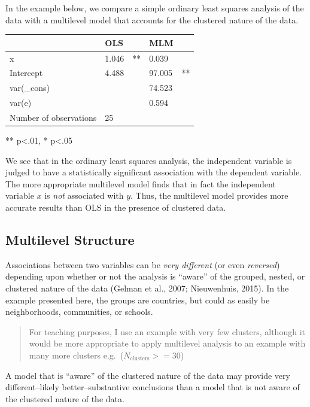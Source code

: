 \documentclass[
  letterpaper,
  DIV=11,
  numbers=noendperiod]{scrreprt}
\begin{document}
In the example below, we compare a simple ordinary least squares
analysis of the data with a multilevel model that accounts for the
clustered nature of the data.

\begin{longtable}[]{@{}lllll@{}}
\toprule\noalign{}
& OLS & & MLM & \\
\midrule\noalign{}
\endhead
\bottomrule\noalign{}
\endlastfoot
x & 1.046 & ** & 0.039 & \\
Intercept & 4.488 & & 97.005 & ** \\
var(\_cons) & & & 74.523 & \\
var(e) & & & 0.594 & \\
Number of observations & 25 & & & \\
\end{longtable}

** p\textless.01, * p\textless.05

We see that in the ordinary least squares analysis, the independent
variable is judged to have a statistically significant association with
the dependent variable. The more appropriate multilevel model finds that
in fact the independent variable \(x\) is \emph{not} associated with
\(y\). Thus, the multilevel model provides more accurate results than
OLS in the presence of clustered data.

\subsection{Multilevel Structure}\label{sec-multilevelstructure}

Associations between two variables can be \emph{very different} (or even
\emph{reversed}) depending upon whether or not the analysis is ``aware''
of the grouped, nested, or clustered nature of the data (Gelman et al.,
2007; Nieuwenhuis, 2015). In the example presented here, the groups are
countries, but could as easily be neighborhoods, communities, or
schools.

\begin{quote}
For teaching purposes, I use an example with very few clusters, although
it would be more appropriate to apply multilevel analysis to an example
with many more clusters e.g.~(\(N_\text{clusters} >= 30\))
\end{quote}

A model that is ``aware'' of the clustered nature of the data may
provide very different--likely better--substantive conclusions than a
model that is not aware of the clustered nature of the data.
 
\end{document}
